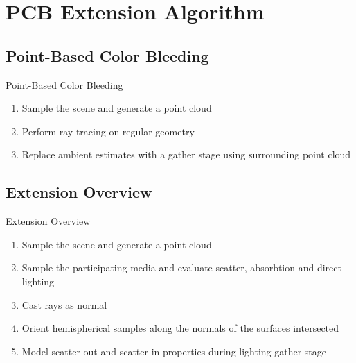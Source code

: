 \documentclass[10pt,handout,compress,professionalfont]{beamer}
\begin{document}
\section{PCB Extension Algorithm}
\subsection{Point-Based Color Bleeding}
\begin{frame}{Point-Based Color Bleeding}

    \begin{enumerate}
        \item Sample the scene and generate a point cloud
        \item Perform ray tracing on regular geometry
        \item Replace ambient estimates with a gather stage using surrounding point cloud
    \end{enumerate}

\end{frame}




\subsection{Extension Overview}
\begin{frame}{Extension Overview}

    \begin{enumerate}
        \item Sample the scene and generate a point cloud
        \item Sample the participating media and evaluate scatter, absorbtion and direct lighting
        \item Cast rays as normal
        \item Orient hemispherical samples along the normals of the surfaces intersected
        \item Model scatter-out and scatter-in properties during lighting gather stage
    \end{enumerate}

\end{frame}
\end{document}
